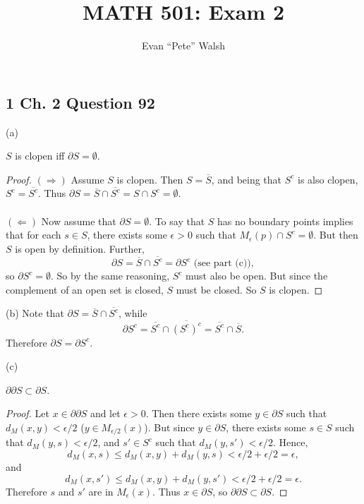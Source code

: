 \documentclass[11pt]{article}
\begin{document}
\title{MATH 501: Exam 2}
\author{Evan ``Pete'' Walsh}
\maketitle

\subsection*{1 Ch. 2 Question 92}

(a) 
\begin{Proposition}
  $S$ is clopen iff $\partial S = \emptyset$.
\end{Proposition}

\begin{proof}
  $(\Rightarrow)$ Assume $S$ is clopen. Then $S = \overline{S}$, and being that $S^{c}$ is also clopen,
  $S^{c} = \overline{S^{c}}$. Thus $\partial S = \overline{S}\cap \overline{S^{c}} = S\cap S^{c} = \emptyset$. \\ \\
  $(\Leftarrow)$ Now assume that $\partial S = \emptyset$. To say that $S$ has no boundary points implies 
  that for each $s \in S$, there exists some $\epsilon > 0$ such that $M_{\epsilon}(p) \cap S^{c} = \emptyset$.
  But then $S$ is open by definition. Further, 
  \[ \partial S = \overline{S} \cap \overline{S^{c}} = \partial S^{c} \text{ (see part (c))}, \]
  so $\partial S^{c} = \emptyset$. So by the same reasoning, $S^{c}$ must also be open.
  But since the complement of an open set is closed, $S$ must be closed. So $S$ is clopen.
\end{proof}

(b) Note that $\partial S = \overline{S} \cap \overline{S^{c}}$, while 
\[ \partial S^{c} = \overline{S^{c}} \cap \overline{(S^{c})^{c}} = \overline{S^{c}} \cap \overline{S}. \]
Therefore $\partial S = \partial S^{c}$.

(c) \begin{Proposition}
$\partial \partial S \subset \partial S$.
\end{Proposition}

\begin{proof}
  Let $x\in \partial\partial S$ and let $\epsilon > 0$. Then there exists some $y\in \partial S$ such that 
  $d_{M}(x,y) < \epsilon / 2$ ($y\in M_{\epsilon/2}(x)$). But since $y \in \partial S$, there exists some 
  $s \in S$ such that $d_{M}(y,s) < \epsilon / 2$, and $s' \in S^{c}$ such that $d_{M}(y,s') < \epsilon / 2$. Hence,
  \[ d_{M}(x, s) \leq d_{M}(x,y) + d_{M}(y,s) < \epsilon / 2 + \epsilon / 2 = \epsilon, \]
  and 
  \[ d_{M}(x,s') \leq d_{M}(x,y) + d_{M}(y,s') < \epsilon / 2 + \epsilon / 2 = \epsilon. \]
  Therefore $s$ and $s'$ are in $M_{\epsilon}(x)$. Thus $x \in \partial S$, so $\partial\partial S \subset \partial S$.
\end{proof}
\end{document}
